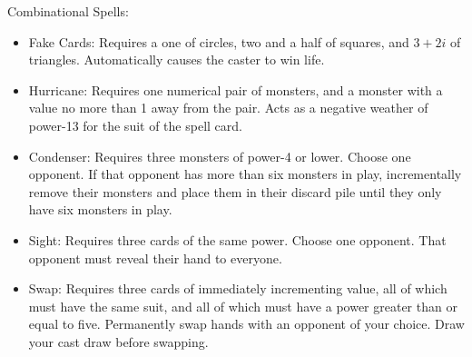 \documentclass[letterpaper, reqno, 11pt]{article}
\begin{document}
Combinational Spells:
\begin{itemize}
\item Fake Cards: Requires a one of circles, two and a half of squares, and $3+2i$ of triangles. Automatically causes the caster to win life.
\item Hurricane: Requires one numerical pair of monsters, and a monster with a value no more than 1 away from the pair. Acts as a negative weather of power-13 for the suit of the spell card.
\item Condenser: Requires three monsters of power-4 or lower. Choose one opponent. If that opponent has more than six monsters in play, incrementally remove their monsters and place them in their discard pile until they only have six monsters in play.
\item Sight: Requires three cards of the same power. Choose one opponent. That opponent must reveal their hand to everyone.
\item Swap: Requires three cards of immediately incrementing value, all of which must have the same suit, and all of which must have a power greater than or equal to five. Permanently swap hands with an opponent of your choice. Draw your cast draw before swapping.
\end{itemize}
\end{document}
